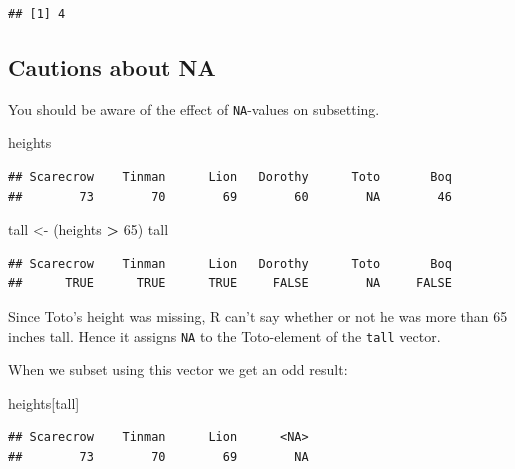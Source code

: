 \documentclass[]{book}
\makeatletter
\newenvironment{Shaded}{\begin{snugshade}}{\end{snugshade}}
\newcommand{\DecValTok}[1]{\textcolor[rgb]{0.00,0.00,0.81}{#1}}
\newcommand{\StringTok}[1]{\textcolor[rgb]{0.31,0.60,0.02}{#1}}
\newcommand{\OperatorTok}[1]{\textcolor[rgb]{0.81,0.36,0.00}{\textbf{#1}}}
\newcommand{\NormalTok}[1]{#1}
\newenvironment{kframe}{%
\medskip{}
\setlength{\fboxsep}{.8em}
 \def\at@end@of@kframe{}%
 \ifinner\ifhmode%
  \def\at@end@of@kframe{\end{minipage}}%
  \begin{minipage}{\columnwidth}%
 \fi\fi%
 \def\FrameCommand##1{\hskip\@totalleftmargin \hskip-\fboxsep
 \colorbox{shadecolor}{##1}\hskip-\fboxsep
     \hskip-\linewidth \hskip-\@totalleftmargin \hskip\columnwidth}%
 \MakeFramed {\advance\hsize-\width
   \@totalleftmargin\z@ \linewidth\hsize
   \@setminipage}}%
 {\par\unskip\endMakeFramed%
 \at@end@of@kframe}
\renewenvironment{Shaded}{\begin{kframe}}{\end{kframe}}
\theoremstyle{definition}
\theoremstyle{definition}
\theoremstyle{definition}
\theoremstyle{remark}
\makeatother
\begin{document}
\begin{verbatim}
## [1] 4
\end{verbatim}

\subsection{Cautions about NA}\label{cautions-about-na}

You should be aware of the effect of \texttt{NA}-values on subsetting.

\begin{Shaded}
\begin{Highlighting}[]
\NormalTok{heights}
\end{Highlighting}
\end{Shaded}

\begin{verbatim}
## Scarecrow    Tinman      Lion   Dorothy      Toto       Boq 
##        73        70        69        60        NA        46
\end{verbatim}

\begin{Shaded}
\begin{Highlighting}[]
\NormalTok{tall <-}\StringTok{ }\NormalTok{(heights }\OperatorTok{>}\StringTok{ }\DecValTok{65}\NormalTok{)}
\NormalTok{tall}
\end{Highlighting}
\end{Shaded}

\begin{verbatim}
## Scarecrow    Tinman      Lion   Dorothy      Toto       Boq 
##      TRUE      TRUE      TRUE     FALSE        NA     FALSE
\end{verbatim}

Since Toto's height was missing, R can't say whether or not he was more
than 65 inches tall. Hence it assigns \texttt{NA} to the Toto-element of
the \texttt{tall} vector.

When we subset using this vector we get an odd result:

\begin{Shaded}
\begin{Highlighting}[]
\NormalTok{heights[tall]}
\end{Highlighting}
\end{Shaded}

\begin{verbatim}
## Scarecrow    Tinman      Lion      <NA> 
##        73        70        69        NA
\end{verbatim}
\end{document}
